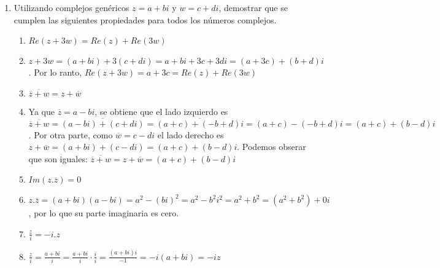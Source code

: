 \documentclass[a4paper]{article}
\newcommand{\answer}{\item[**]}
\newcommand{\exercise}{\item}
\newcommand{\df}[2]{\displaystyle\frac{#1}{#2}}
\newcommand{\conj}[1]{\overline{#1}}
\begin{document}
\begin{enumerate}
\begin{enumerate} [label=(\alph*)]
		\item Dado $z=2e^{\beta i}$ y $w=1+i$, el argumento de $z.w$ será $\beta+\df{\pi}{4}$
		\answer Verdadero. En su forma exponencial $w=\sqrt{2}e^{\frac{\pi}{4}i}$ por lo que $z.w=\left(2e^{\beta i}\right).\left(\sqrt{2}e^{\frac{\pi}{4}i}\right)=2\sqrt{2}e^{\left(\beta i + \frac{\pi}{4}i\right)}=2\sqrt{2}e^{\left(\beta + \frac{\pi}{4}\right)i}$

		\item Si $z$ es un número imaginario puro, entonces $z^2$ es un número real puro
		\answer Verdadero. Si $z=0+bi$, entonces $z^2=(bi)^2=-b^2+0i$. Como $Im(z^2)=0$, $z^2$ es un número real puro.

		\item La distancia entre $z=2$ y $w=3+3i$ es $\sqrt{5}$
		\answer Falso. $d(z,w)=|z-w|=|2-(3+3i)|=|-1-3i|=\sqrt{1+9}=\sqrt{10}$

		\item Dado $z=1+2i$ y $w=3+4i$, el cálculo de $|z-w|$ es equivalente a la distancia $d(z,w)$
		\answer Verdadero. $d(z,w)=\sqrt{\left(1-3\right)^2+\left(2-4\right)^2}=\sqrt{8}$ y $|z-w|=|-2-2i|=\sqrt{4+4}=\sqrt{8}$

	\end{enumerate}


	\exercise Utilizando complejos genéricos $z=a+bi$ y $w=c+di$, demostrar que se cumplen las siguientes propiedades para todos los números complejos.
	\begin{multicols}{2}
	\begin{enumerate} [label=(\alph*)]
		\item $Re(z+3w)=Re(z)+Re(3w)$
		\answer $z+3w=(a+bi)+3(c+di)=a+bi+3c+3di=(a+3c)+(b+d)i$. Por lo ranto, $Re(z+3w)=a+3c=Re(z)+Re(3w)$

		\item $\conj{\conj{z}+w}=z+\conj{w}$
		\answer Ya que $\conj{z}=a-bi$, se obtiene que el lado izquierdo es $\conj{\conj{z}+w}= \conj{(a-bi)+(c+di)} = \conj{(a+c)+(-b+d)i} = (a+c)-(-b+d)i = (a+c)+(b-d)i$. Por otra parte, como $\conj{w}=c-di$ el lado derecho es $z+\conj{w}=(a+bi)+(c-di)=(a+c)+(b-d)i$. Podemos obserar que son iguales: $\conj{\conj{z}+w}=z+\conj{w}=(a+c)+(b-d)i$

		\item $Im(z.\conj{z})=0$
		\answer $z.\conj{z}=(a+bi)(a-bi)=a^2-(bi)^2=a^2-b^2 i^2=a^2+b^2=(a^2+b^2)+0i$, por lo que su parte imaginaria es cero.

		\item $\df{z}{i}=-i.z$
		\answer $\df{z}{i}=\df{a+bi}{i}=\df{a+bi}{i}\cdot\df{i}{i}=\df{(a+bi)i}{-1}=-i(a+bi)=-iz$


\end{enumerate}
\end{multicols}
\end{enumerate}
\end{document}
